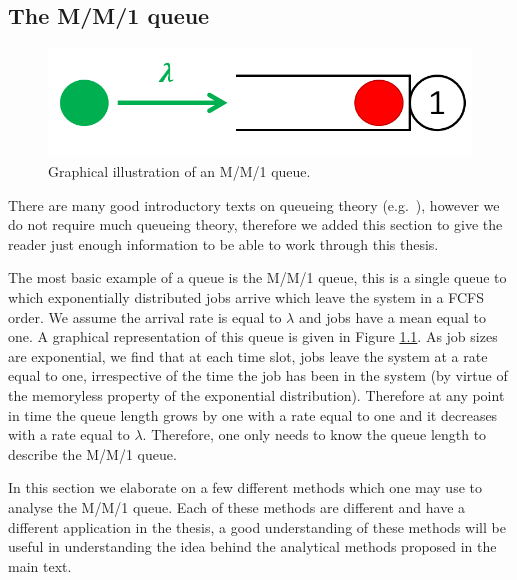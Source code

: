 \documentclass[12pt]{report}
\begin{document}
\begin{appendices}
\chapter{The M/M/1 queue} \label{appendix:queueing}
\begin{figure}
\begin{center}
\includegraphics[scale=1]{figures/Appendix/MM1.PNG}
\end{center}
\caption{Graphical illustration of an M/M/1 queue.}\label{fig:MM1}
\end{figure}

There are many good introductory texts on queueing theory (e.g.~\cite{bookMor}), however we do not require much queueing theory, therefore we added this section to give the reader just enough information to be able to work through this thesis.

The most basic example of a queue is the M/M/1 queue, this is a single queue to which exponentially distributed jobs arrive which leave the system in a FCFS order. We assume the arrival rate is equal to $\lambda$ and jobs have a mean equal to one. A graphical representation of this queue is given in Figure \ref{fig:MM1}. As job sizes are exponential, we find that at each time slot, jobs leave the system at a rate equal to one, irrespective of the time the job has been in the system (by virtue of the memoryless property of the exponential distribution). Therefore at any point in time the queue length grows by one with a rate equal to one and it decreases with a rate equal to $\lambda$. Therefore, one only needs to know the queue length to describe the M/M/1 queue.

In this section we elaborate on a few different methods which one may use to analyse the M/M/1 queue. Each of these methods are different and have a different application in the thesis, a good understanding of these methods will be useful in understanding the idea behind the analytical methods proposed in the main text.


\end{appendices}
\end{document}
